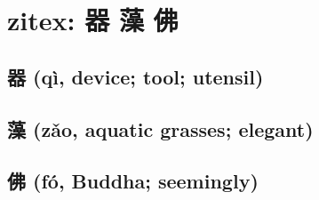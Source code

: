 \documentclass{article}
\begin{document}
\section*{zitex: 器 藻 佛}

\subsection*{器 \normalfont\small(qì, device; tool; utensil)}

\qquad{}


\subsection*{藻 \normalfont\small(zǎo, aquatic grasses; elegant)}

\qquad{}


\subsection*{佛 \normalfont\small(fó, Buddha; seemingly)}

\qquad{}

\end{document}
